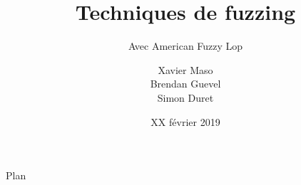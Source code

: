 \documentclass{bredelebeamer}
\title[]{Techniques de fuzzing}
\subtitle{Avec American Fuzzy Lop}
\author[Xavier M. - Brendan G. - Simon D.]{Xavier Maso \\ Brendan Guevel \\ Simon Duret}
\institute[]{
  \texttt{[image: ../medias/universite-bordeaux.pdf]}
}
\date{XX février 2019}
\begin{document}
\begin{frame}
  \titlepage
\end{frame}

\begin{frame}{Plan}
  \tableofcontents
\end{frame}
\end{document}

